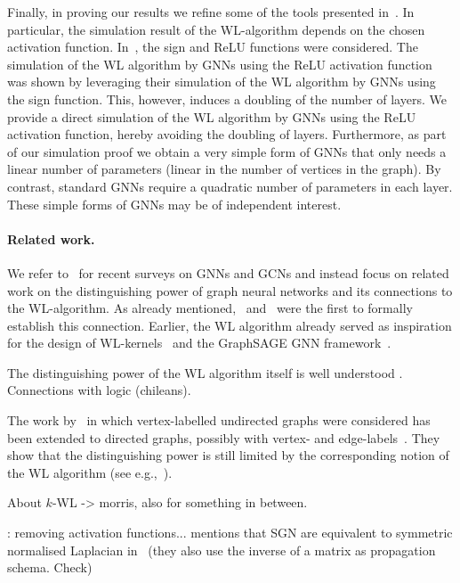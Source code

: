 Finally, in proving our results we refine some of the tools presented in~\cite{grohewl}. In particular, the simulation result of the WL-algorithm depends on the chosen activation function. In~\cite{grohewl}, the sign and ReLU functions were considered. The simulation of the WL algorithm by GNNs using the ReLU activation function was shown by leveraging their simulation of the WL algorithm by GNNs using the sign function. This, however, induces a doubling of the number of layers. We provide a direct simulation of the WL algorithm by GNNs using the ReLU activation function, hereby avoiding the doubling of layers.
Furthermore, as part of our simulation proof we obtain a very simple form of GNNs that only needs a linear number of parameters (linear in the number of vertices in the graph). By contrast, standard GNNs require a quadratic number of parameters in each layer. These simple forms of GNNs may be of independent interest.

\paragraph{Related work.}
We refer to~\cite{Zhou2018,Zonghan2019} for recent surveys on GNNs and GCNs and instead focus on related work on the distinguishing power of graph neural networks and its connections to the WL-algorithm. As already mentioned,~\cite{xhlj19} and~\cite{grohewl}
were the first to formally establish this connection. Earlier, the WL algorithm already served as inspiration for the design of WL-kernels~\cite{Shrvashidze2011} and the GraphSAGE GNN framework~\cite{hyl17}. 

The distinguishing power of the WL algorithm itself is well understood
\cite{CaiFI92,KieferSS15,ArvindKRV17}. Connections with logic (chileans).

The work by~\cite{grohewl} in which vertex-labelled undirected graphs were considered has been extended to directed graphs, possibly with vertex- and edge-labels~\cite{Jaume2019}. They show that the distinguishing power is still limited by the corresponding notion of the WL algorithm (see e.g.,~\cite{}). 

About $k$-WL -> morris, also
\cite{NIPS2019_8488} for something in between.

\cite{Wu2019}\cite{Cai2018}: removing activation functions...
\cite{journals/pieee/OrtegaFKMV18} mentions that SGN are equivalent to symmetric normalised Laplacian in~\cite{Vignac2019OnTC} (they also use the inverse of a matrix as propagation schema. Check)

